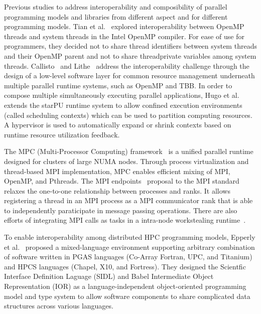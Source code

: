 Previous studies to address interoperability and composibility of parallel programming models and libraries 
from different aspect and for different programming models. 
Tian et al.~\cite{tian2003compiler} explored interoperability between OpenMP threads and system threads in the Intel OpenMP compiler.
For ease of use for programmers, they decided not to share thread identifiers between system threads and their OpenMP parent
and not to share threadprivate variables among system threads.
Callisto~\cite{Callisto:Harris:2014:CCP:2592798.2592807} and
Lithe~\cite{Lithe:Pan:2009:LEE:1855591.1855602} 
address the interoperability challenge 
through the design of a low-level software layer for common 
resource management underneath multiple parallel runtime systems, such as OpenMP and TBB. %
In order to compose multiple simultaneously executing parallel applications, Hugo et al.~\cite{hugo2014composing} extends the starPU runtime system to allow confined execution environments (called scheduling contexts) which can be used to partition computing resources. 
A hypervisor is used to automatically expand or shrink contexts based on runtime resource utilization feedback. 

The MPC (Multi-Processor Computing) framework~\cite{perache2008mpc} is a unified parallel runtime designed for clusters of large NUMA nodes. 
Through process virtualization and thread-based MPI implementation, MPC enables efficient mixing of MPI, OpenMP, and Pthreads. 
The MPI endpoints~\cite{Dinan:mpiendpoint_eurompi13}
proposal to the MPI standard relaxes the one-to-one relationship between processes and ranks.
It allows registering a thread in an MPI
process as a MPI communicator rank that is able to independently paraticipate
in message passing operations. There are also efforts of integrating MPI calls as
tasks in a intra-node workstealing runtime~\cite{hcmpi:ipdps13}.

To enable interoperability among distributed HPC programming models, Epperly et al.~\cite{epperly2011composite} proposed a mixed-language environment supporting arbitrary combination of software written in PGAS languages (Co-Array Fortran, UPC, and Titanium) and HPCS languages (Chapel, X10, and Fortress). 
They designed the Scientfic Interface Definition Laguage (SIDL) and Babel Intermediate Object Representation (IOR) as a language-independent object-oriented programming model and type system
to allow software components to share complicated data structures across various languages. 
